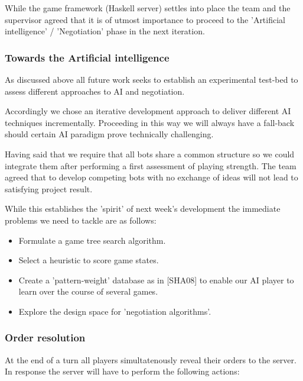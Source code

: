 \documentclass[12pt]{article}
\begin{document}
\begin{itemize}
While the game framework (Haskell server) settles into place the 
team and the supervisor agreed that it is of utmost importance to
proceed to the 'Artificial intelligence' / 'Negotiation' phase in the
next iteration.

\subsubsection{Towards the Artificial intelligence}

As discussed above all future work seeks to establish an experimental
test-bed to assess different approaches to AI and negotiation.

Accordingly we chose an iterative development approach to deliver
different AI techniques incrementally. Proceeding in this way we will always 
have a fall-back should certain AI paradigm prove technically challenging.

Having said that we require that all bots share a common structure so
we could integrate them after performing a first assessment of 
playing strength. The team agreed that to develop competing bots with
no exchange of ideas will not lead to satisfying project result. 

While this establishes the 'spirit' of next week's development the 
immediate problems we need to tackle are as follows:

\begin{itemize}

\item Formulate a game tree search algorithm.

\item Select a heuristic to score game states. 

\item Create a 'pattern-weight' database as in [SHA08] to enable
our AI player to learn over the course of several games.

\item Explore the design space for 'negotiation algorithms'.

\end{itemize}

\subsubsection{Order resolution}

At the end of a turn all players simultatenously reveal their orders to the 
server. In response the server will have to perform the following actions:


\end{itemize}
\end{document}
